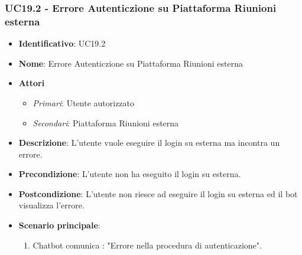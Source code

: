 \subsubsection{UC19.2 - Errore Autenticzione su Piattaforma Riunioni esterna}
\begin{itemize}
	\item \textbf{Identificativo}: UC19.2
	\item \textbf{Nome}: Errore Autenticzione su Piattaforma Riunioni esterna
	\item \textbf{Attori}
	\begin{itemize} 
		\item \textit{Primari}: Utente autorizzato
		\item \textit{Secondari}: Piattaforma Riunioni esterna
	\end{itemize}
	\item \textbf{Descrizione}: L'utente vuole eseguire il login su  esterna ma incontra un errore.
	\item \textbf{Precondizione}: L'utente non ha eseguito il login su  esterna.
	\item \textbf{Postcondizione}: L'utente non riesce ad eseguire il login su  esterna ed il bot visualizza l'errore.
	\item \textbf{Scenario principale}: \begin{enumerate}
		\item Chatbot comunica : "Errore nella procedura di autenticazione". 
	\end{enumerate}
\end{itemize}

